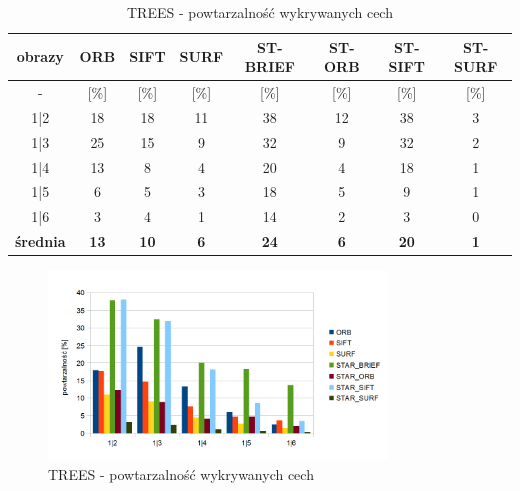 \begin{table}[htbp]
  \centering
  \caption{TREES - powtarzalność wykrywanych cech}
    \begin{tabular}{|c|c|c|c|c|c|c|c|}\hline

    obrazy & \textbf{ORB} & \textbf{SIFT} & \textbf{SURF} & \textbf{ST-BRIEF} & \textbf{ST-ORB} & \textbf{ST-SIFT} & \textbf{ST-SURF} \\\hline

    -  & [\%] & [\%] & [\%] & [\%] & [\%] & [\%] & [\%] \\\hline
    1|2 & 18 & 18 & 11 & 38 & 12 & 38 & 3 \\
    1|3 & 25 & 15 & 9 & 32 & 9 & 32 & 2 \\
    1|4 & 13 & 8 & 4 & 20 & 4 & 18 & 1 \\
    1|5 & 6 & 5 & 3 & 18 & 5 & 9 & 1 \\
    1|6 & 3 & 4 & 1 & 14 & 2 & 3 & 0 \\\hline
    \textbf{średnia} & \textbf{13} & \textbf{10} & \textbf{6} & \textbf{24} & \textbf{6} & \textbf{20} & \textbf{1} \\\hline
   

    \end{tabular}%
  \label{tab:trees_m1}%
\end{table}%


\begin{figure}
\centering
\includegraphics[width=0.8\textwidth]{pict/mikolajczyk/trees/m1.png}
\caption{TREES - powtarzalność wykrywanych cech}
\label{fig:trees_m1}
\end{figure}

